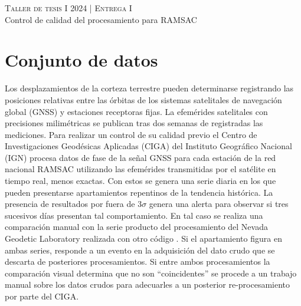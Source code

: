 \documentclass[11pt,spanish,a4paper]{article}
\begin{document}
\begin{center}
  \textsc{\large Taller de tesis I 2024 | Entrega I}\\
	Control de calidad del procesamiento para RAMSAC
\end{center}


\section*{Conjunto de datos}

Los desplazamientos de la corteza terrestre pueden determinarse registrando las posiciones relativas entre las órbitas de los sistemas satelitales de navegación global (GNSS) y estaciones receptoras fijas.
La efemérides satelitales con precisiones milimétricas se publican tras dos semanas de registradas las mediciones.
Para realizar un control de su calidad previo el Centro de Investigaciones Geodésicas Aplicadas (CIGA) del Instituto Geográfico Nacional (IGN) procesa datos de fase de la señal GNSS para cada estación de la red nacional RAMSAC \cite{noauthor_centro_nodate} utilizando las efemérides transmitidas por el satélite en tiempo real, menos exactas.
Con estos se genera una serie diaria en los que pueden presentarse apartamientos repentinos de la tendencia histórica.
La presencia de resultados por fuera de \(3 \sigma\) genera una alerta para observar si tres sucesivos días presentan tal comportamiento.
En tal caso se realiza una comparación manual con la serie producto del procesamiento del Nevada Geodetic Laboratory realizada con otro código \cite{noauthor_magnet_nodate}.
Si el apartamiento figura en ambas series, responde a un evento en la adquisición del dato crudo que se descarta de posteriores procesamientos.
Si entre ambos procesamientos la comparación visual determina que no son ``coincidentes'' se procede a un trabajo manual sobre los datos crudos para adecuarles a un posterior re-procesamiento por parte del CIGA.
 
\end{document}
